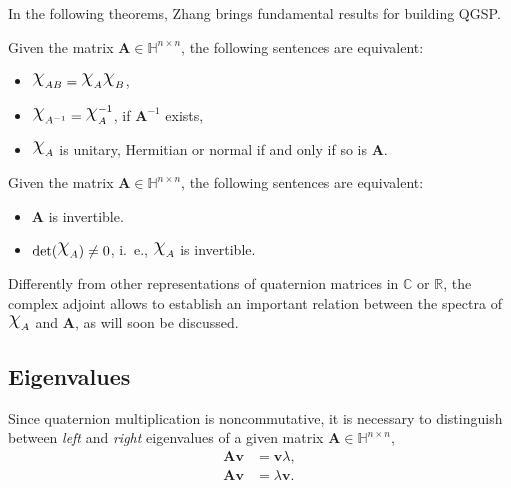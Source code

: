 In the following theorems, Zhang brings fundamental results for building QGSP.

\begin{theorem}
    \label{th:equiv01}
    Given the matrix $ \mathbf{A} \in \mathbb{H}^{n \times n} $, the following sentences are equivalent:

    \begin{itemize}[noitemsep]
        \item $ \rchi_{AB} = \rchi_{A} \rchi_{B} $,
        \item $ \rchi_{A^{-1}} = \rchi_{A}^{-1}$, if $ \mathbf{A}^{-1} $ exists,
        \item $ \rchi_{A}$ is unitary, Hermitian or normal if and only if so is $ \mathbf{A} $.
    \end{itemize}

\end{theorem}

\begin{theorem}
    \label{th:equiv02}
    Given the matrix $ \mathbf{A} \in \mathbb{H}^{n \times n} $, the following sentences are equivalent:

    \begin{itemize}[noitemsep]
        \item $\mathbf{A}$ is invertible.
        \item $\mathrm{det}(\rchi_A) \neq 0$, i.~e., $\rchi_{A}$ is invertible.
    \end{itemize}

\end{theorem}

Differently from other representations of quaternion matrices in $ \mathbb{C} $ or $ \mathbb{R} $, the complex adjoint allows to establish an important relation between the spectra of $ \rchi_{A} $ and $ \mathbf{A} $, as will soon be discussed.

\subsection{Eigenvalues}
Since quaternion multiplication is noncommutative, it is necessary to distinguish between \textit{left} and \textit{right} eigenvalues of a given matrix $ \mathbf{A} \in \mathbb{H}^{n \times n} $,
\begin{align*}
    \mathbf{A} \mathbf{v} & = \mathbf{v} \lambda, \tag{right} \\
    \mathbf{A} \mathbf{v} & = \lambda \mathbf{v}.  \tag{left}
\end{align*}

